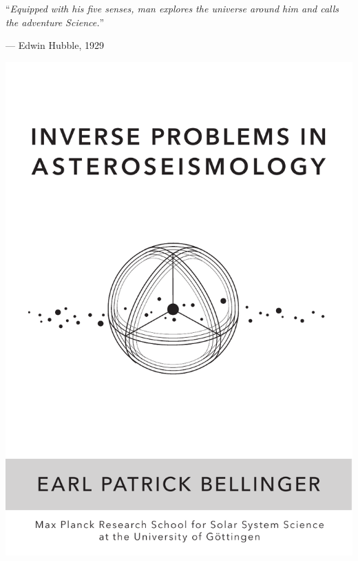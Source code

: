 
\clearpage
\thispagestyle{empty}
\vspace*{8cm}%
\hspace*{0.5cm}\begin{minipage}[c]{0.5\linewidth}
\epigraph{``\emph{Equipped with his five senses, man explores the universe around him and calls \phantom{``}the adventure Science.}''}{--- Edwin Hubble, 1929}
\end{minipage}
\vspace*{3.4cm}%
\begin{center}
\begin{minipage}[c]{0.66\linewidth}%
\begin{center}%
\includegraphics[width=\linewidth,trim={1cm 7cm 1.55cm 7cm},clip]{thesis_logo.pdf}%
\end{center}
\end{minipage}
\end{center}
